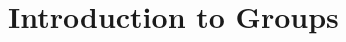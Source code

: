 \documentclass[../main.tex]{subfiles}
\begin{document}
\chapter{Introduction to Groups}
\end{document}
